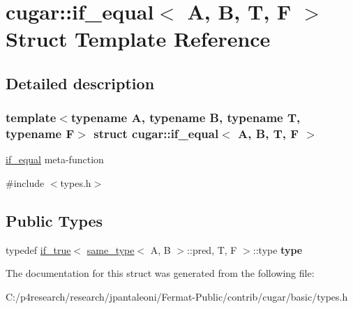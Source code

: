 \hypertarget{structcugar_1_1if__equal}{}\section{cugar\+:\+:if\+\_\+equal$<$ A, B, T, F $>$ Struct Template Reference}
\label{structcugar_1_1if__equal}


\subsection{Detailed description}
\subsubsection*{template$<$typename A, typename B, typename T, typename F$>$\newline
struct cugar\+::if\+\_\+equal$<$ A, B, T, F $>$}

\hyperlink{structcugar_1_1if__equal}{if\+\_\+equal} meta-\/function 

{\ttfamily \#include $<$types.\+h$>$}

\subsection*{Public Types}
\begin{DoxyCompactItemize}
\item 
\mbox{\label{structcugar_1_1if__equal_ab29119a33f3e42270c06cd10b73af18b}} 
typedef \hyperlink{structcugar_1_1if__true}{if\+\_\+true}$<$ \hyperlink{structcugar_1_1same__type}{same\+\_\+type}$<$ A, B $>$\+::pred, T, F $>$\+::type {\bfseries type}
\end{DoxyCompactItemize}


The documentation for this struct was generated from the following file\+:\begin{DoxyCompactItemize}
\item 
C\+:/p4research/research/jpantaleoni/\+Fermat-\/\+Public/contrib/cugar/basic/types.\+h\end{DoxyCompactItemize}
